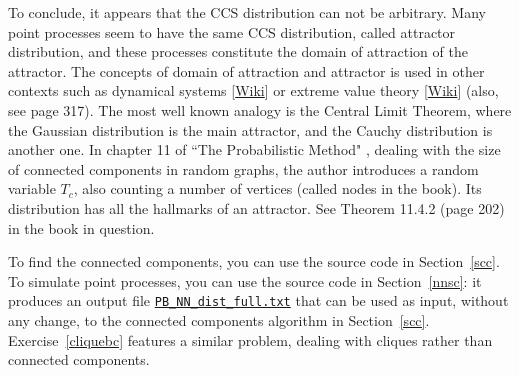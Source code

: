 \documentclass[10pt]{article}
\begin{document}
\begin{Exercise}
To conclude, it appears that the CCS distribution can not be arbitrary. Many point processes seem to have the same CCS distribution, called \textcolor{index}{attractor distribution},  and these processes constitute the
\textcolor{index}{domain of attraction} of the attractor. The concepts of domain of attraction and attractor is used in other contexts such as \textcolor{index}{dynamical systems} [\href{https://en.wikipedia.org/wiki/Attractor}{Wiki}] or extreme value theory [\href{https://en.wikipedia.org/wiki/Generalized_extreme_value_distribution}{Wiki}] (also, see \cite{order2} page 317). The most well known analogy is the \textcolor{index}{Central Limit Theorem}, where the Gaussian distribution is the main attractor, and the Cauchy distribution is another one. In chapter 11 of ``The Probabilistic Method"  \cite{probme},
dealing with the size of connected components in random graphs, the author introduces a random variable $T_c$, also counting a number of vertices
(called \textcolor{index}{nodes} in the book). Its distribution has all the hallmarks of an attractor. See  Theorem 11.4.2 (page 202) in the book in question.

To find the connected components, you can use the source code in Section~\ref{scc}. To simulate point processes, you can use the source code
 in Section~\ref{nnsc}: it produces an output file
\href{https://github.com/VincentGranville/Point-Processes/blob/main/Data/PB_NN_dist_full.txt}{\texttt{PB\_NN\_dist\_full.txt}}
that can be used as input, without any change, to the connected components algorithm in Section~\ref{scc}.  Exercise~\ref{cliquebc} features a similar problem, dealing with cliques
 rather than connected components.
\end{Exercise}
\end{document}

